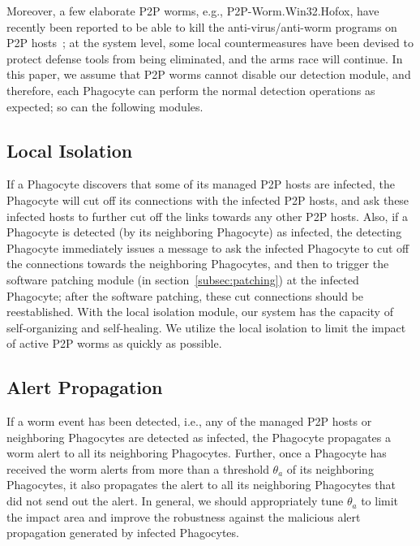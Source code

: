 \documentclass[times,10pt,twocolumn]{article}
\begin{document}
Moreover, a few elaborate P2P worms, e.g., P2P-Worm.Win32.Hofox,
have recently been reported to be able to kill the
anti-virus/anti-worm programs on P2P hosts~\cite{p2p-worm-website};
at the system level, some local countermeasures have been devised to
protect defense tools from being eliminated, and the arms race will
continue. In this paper, we assume that P2P worms cannot disable our
detection module, and therefore, each Phagocyte can perform the
normal detection operations as expected; so can the following
modules.




\subsection{Local Isolation}



If a Phagocyte discovers that some of its managed P2P hosts are
infected, the Phagocyte will cut off its connections with the
infected P2P hosts, and ask these infected hosts to further cut off
the links towards any other P2P hosts. Also, if a Phagocyte is
detected (by its neighboring Phagocyte) as infected, the detecting
Phagocyte immediately issues a message to ask the infected Phagocyte
to cut off the connections towards the neighboring Phagocytes, and
then to trigger the software patching module (in
section~\ref{subsec:patching}) at the infected Phagocyte; after the
software patching, these cut connections should be reestablished.
With the local isolation module, our system has the capacity of
self-organizing and self-healing. We utilize the local isolation to
limit the impact of active P2P worms as quickly as possible.








\subsection{Alert Propagation}

If a worm event has been detected, i.e., any of the managed P2P
hosts or neighboring Phagocytes are detected as infected, the
Phagocyte propagates a worm alert to all its neighboring Phagocytes.
Further, once a Phagocyte has received the worm alerts from more
than a threshold $\theta_a$ of its neighboring Phagocytes, it also
propagates the alert to all its neighboring Phagocytes that did not
send out the alert. In general, we should appropriately tune
$\theta_a$ to limit the impact area and improve the robustness
against the malicious alert propagation generated by infected
Phagocytes.
\end{document}
